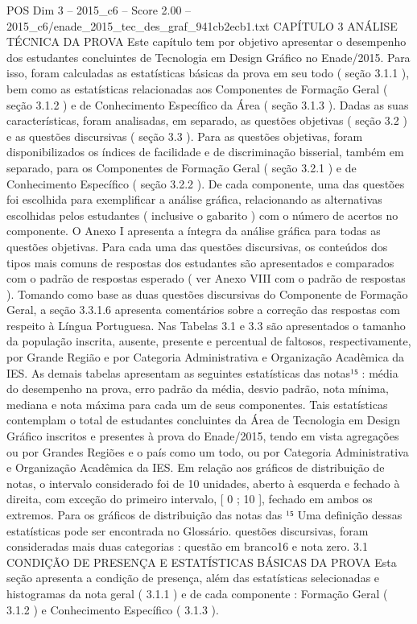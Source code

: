 \begin{textsample}{POS Dim 3 – 2015\_c6 – Score 2.00 – 2015\_c6/enade\_2015\_tec\_des\_graf\_941cb2ecb1.txt}  \label{ex:f3_pos_213}
CAPÍTULO 3 ANÁLISE TÉCNICA DA PROVA Este capítulo tem por objetivo apresentar o desempenho dos estudantes concluintes de Tecnologia em Design Gráfico no Enade/2015.
Para isso, foram calculadas as estatísticas básicas da prova em seu todo ( seção 3.1.1 ), bem como as estatísticas relacionadas aos Componentes de Formação Geral ( seção 3.1.2 ) e de Conhecimento Específico da Área ( seção 3.1.3 ).
Dadas as suas características, foram analisadas, em separado, as questões objetivas ( seção 3.2 ) e as questões discursivas ( seção 3.3 ).
Para as questões objetivas, foram disponibilizados os índices de facilidade e de discriminação bisserial, também em separado, para os Componentes de Formação Geral ( seção 3.2.1 ) e de Conhecimento Específico ( seção 3.2.2 ).
De cada componente, uma das questões foi escolhida para exemplificar a análise gráfica, relacionando as alternativas escolhidas pelos estudantes ( inclusive o gabarito ) com o número de acertos no componente.
O Anexo I apresenta a íntegra da análise gráfica para todas as questões objetivas.
Para cada uma das questões discursivas, os conteúdos dos tipos mais comuns de respostas dos estudantes são apresentados e comparados com o padrão de respostas esperado ( ver Anexo VIII com o padrão de respostas ).
Tomando como base as duas questões discursivas do Componente de Formação Geral, a seção 3.3.1.6 apresenta comentários sobre a correção das respostas com respeito à Língua Portuguesa.
Nas Tabelas 3.1 e 3.3 são apresentados o tamanho da população inscrita, ausente, presente e percentual de faltosos, respectivamente, por Grande Região e por Categoria Administrativa e Organização Acadêmica da IES.
As demais tabelas apresentam as seguintes estatísticas das notas¹⁵ : média do desempenho na prova, erro padrão da média, desvio padrão, nota mínima, mediana e nota máxima para cada um de seus componentes.
Tais estatísticas contemplam o total de estudantes concluintes da Área de Tecnologia em Design Gráfico inscritos e presentes à prova do Enade/2015, tendo em vista agregações ou por Grandes Regiões e o país como um todo, ou por Categoria Administrativa e Organização Acadêmica da IES.
Em relação aos gráficos de distribuição de notas, o intervalo considerado foi de 10 unidades, aberto à esquerda e fechado à direita, com exceção do primeiro intervalo, [ 0 ; 10 ], fechado em ambos os extremos.
Para os gráficos de distribuição das notas das ¹⁵ Uma definição dessas estatísticas pode ser encontrada no Glossário. questões discursivas, foram consideradas mais duas categorias : questão em branco16 e nota zero. 3.1 CONDIÇÃO DE PRESENÇA E ESTATÍSTICAS BÁSICAS DA PROVA Esta seção apresenta a condição de presença, além das estatísticas selecionadas e histogramas da nota geral ( 3.1.1 ) e de cada componente : Formação Geral ( 3.1.2 ) e Conhecimento Específico ( 3.1.3 ).

\end{textsample}
